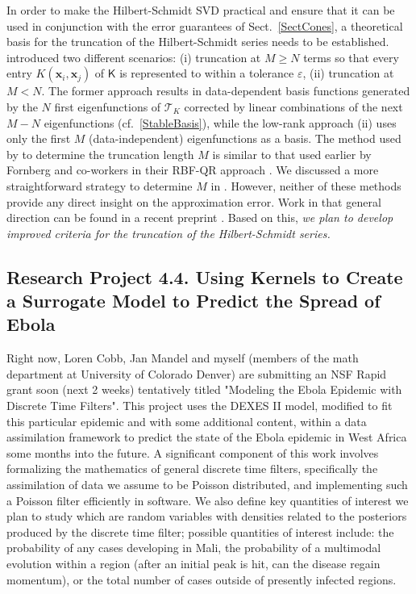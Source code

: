 \documentclass[11pt]{NSFamsart}
\newcommand{\mK}{\mathsf{K}}
\newcommand{\bx}{{\boldsymbol{x}}}
\newcommand{\cT}{\mathcal{T}}
\begin{document}
In order to make the Hilbert-Schmidt SVD practical and ensure that it can be used in conjunction with the error guarantees of Sect.~\ref{SectCones}, a theoretical basis for the truncation of the Hilbert-Schmidt series needs to be established. \cite{FMcC12} introduced two different scenarios: (i) truncation at $M\ge N$ terms so that every entry $K(\bx_i,\bx_j)$ of $\mK$ is represented to within a tolerance $\varepsilon$, (ii) truncation at $M < N$. The former approach results in data-dependent basis functions generated by the $N$ first eigenfunctions of $\cT_K$ corrected by linear combinations of the next $M-N$ eigenfunctions (cf.~\eqref{StableBasis}), while the low-rank approach (ii) uses only the first $M$ (data-independent) eigenfunctions as a basis. The method used by \cite{FMcC12} to determine the truncation length $M$ is similar to that used earlier by Fornberg and co-workers in their RBF-QR approach \citep{FornbergPiret08, FornbergFlyerLarsson11}.  We discussed a more straightforward strategy to determine $M$ in \cite{CavorettoEtAl14}. However, neither of these methods provide any direct insight on the approximation error. Work in that general direction can be found in a recent preprint \citep{GriebelRiegerZwicknagl13}. Based on this, \emph{we plan to develop improved criteria for the truncation of the Hilbert-Schmidt series.}

\subsection*{Research Project 4.4. Using Kernels to Create a Surrogate Model to Predict the Spread of Ebola} \label{ebolasubsec}
Right now, Loren Cobb, Jan Mandel and myself (members of the math department at University of Colorado Denver) are submitting an NSF Rapid grant soon (next 2 weeks) tentatively titled "Modeling the Ebola Epidemic with Discrete Time Filters".  This project uses the DEXES II model, modified to fit this particular epidemic and with some additional content, within a data assimilation framework to predict the state of the Ebola epidemic in West Africa some months into the future.  A significant component of this work involves formalizing the mathematics of general discrete time filters, specifically the assimilation of data we assume to be Poisson distributed, and implementing such a Poisson filter efficiently in software.  We also define key quantities of interest we plan to study which are random variables with densities related to the posteriors produced by the discrete time filter; possible quantities of interest include: the probability of any cases developing in Mali, the probability of a multimodal evolution within a region (after an initial peak is hit, can the disease regain momentum), or the total number of cases outside of presently infected regions.
\end{document}

